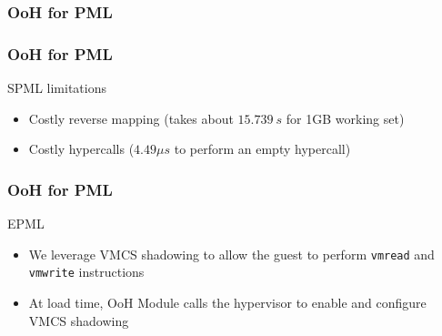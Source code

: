 \documentclass[xcolor=table,bigger,unknownkeysallowed]{beamer}
\begin{document}
        \begin{frame}
                \frametitle{OoH for PML}	
 		    \begin{figure}
			\centering
{}				
			\end{figure}
        \end{frame}
        \begin{frame}
                \frametitle{OoH for PML}			
			\begin{block}{SPML limitations}
				\begin{itemize}
					\item Costly reverse mapping (takes about $15.739 \: s$ for 1GB working set)
					\item Costly hypercalls ($4.49 \mu s$ to perform an empty hypercall)
				\end{itemize}
			\end{block} 
        \end{frame}
        \begin{frame}
                \frametitle{OoH for PML}			
			\begin{block}{EPML}
				\begin{itemize}
					\item We leverage VMCS shadowing to allow the guest to perform \texttt{vmread} and \texttt{vmwrite} instructions
					\item At load time, OoH Module calls the hypervisor to enable and configure VMCS shadowing
				\end{itemize}
			\end{block} 
        \end{frame} 
\end{document}
